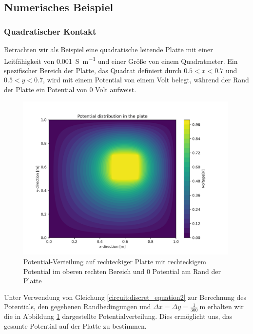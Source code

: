 \subsection{Numerisches Beispiel} 
\subsubsection{Quadratischer Kontakt}
Betrachten wir als Beispiel eine quadratische leitende Platte mit einer Leitfähigkeit von \SI{0.001}{\siemens\per\meter} und einer Größe von einem Quadratmeter. Ein spezifischer Bereich der Platte, das Quadrat definiert durch $0.5 < x < 0.7$ und $0.5 < y < 0.7$, wird mit einem Potential von einem Volt belegt, während der Rand der Platte ein Potential von 0 Volt aufweist.

\begin{figure}
	\centering
	\includegraphics[width=0.99\textwidth]{papers/circuit/potential_distribution.png}
	\caption{Potential-Verteilung auf rechteckiger Platte mit rechteckigem Potential im oberen rechten Bereich und 0 Potential am Rand der Platte \cite{github:AndreasFMueller}}
	\label{fig:potential_distribution}
\end{figure}
Unter Verwendung von Gleichung \eqref{circuit:discret_equation2} zur Berechnung des Potentials, den gegebenen Randbedingungen und $\Delta x = \Delta y = \frac{1}{300}\SI{}{\meter}$ erhalten wir die in Abbildung \ref{fig:potential_distribution} dargestellte Potentialverteilung. Dies ermöglicht uns, das gesamte Potential auf der Platte zu bestimmen.

